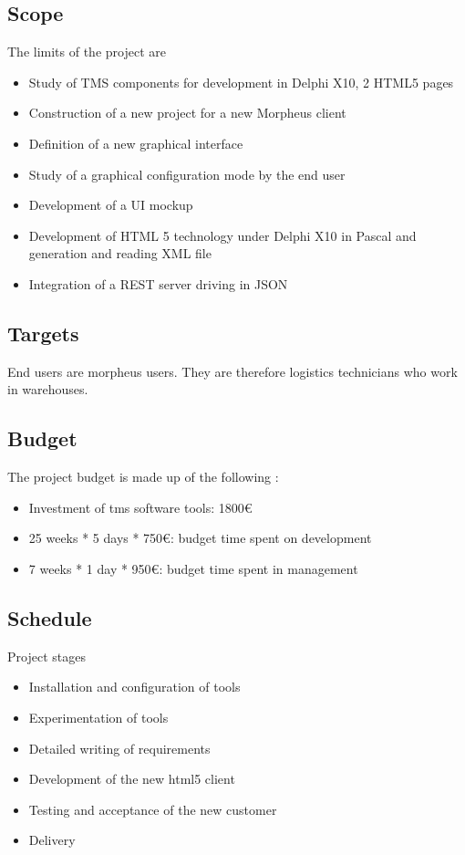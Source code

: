 \documentclass[a4paper, 12pt, french]{article}
\newcommand{\bdot}{\item[\color{ssiYellow}\ding{108}]}
\begin{document}
		\subsection{Scope}
			The limits of the project are
			\begin{itemize}
				\bdot{Study of TMS components for development in Delphi X10, 2 HTML5 pages}
				\bdot{Construction of a new project for a new Morpheus client}
				\bdot{Definition of a new graphical interface}
				\bdot{Study of a graphical configuration mode by the end user}
				\bdot{Development of a UI mockup}
				\bdot{Development of HTML 5 technology under Delphi X10 in Pascal and generation and reading XML file}
				\bdot{Integration of a REST server driving in JSON}
			\end{itemize}
		\subsection{Targets}
			End users are morpheus users. They are therefore logistics technicians who work in warehouses.
		\subsection{Budget}	
			The project budget is made up of the following :
			\begin{itemize}
				\bdot{Investment of tms software tools: 1800€}
				\bdot{25 weeks * 5 days * 750€: budget time spent on development}
				\bdot{7 weeks * 1 day * 950€: budget time spent in management}
			\end{itemize}
		\subsection{Schedule}
			Project stages
			\begin{itemize}
				\bdot{Installation and configuration of tools}
				\bdot{Experimentation of tools}
				\bdot{Detailed writing of requirements}
				\bdot{Development of the new html5 client}
				\bdot{Testing and acceptance of the new customer}
				\bdot{Delivery}
			\end{itemize}
	

	
\end{document}
